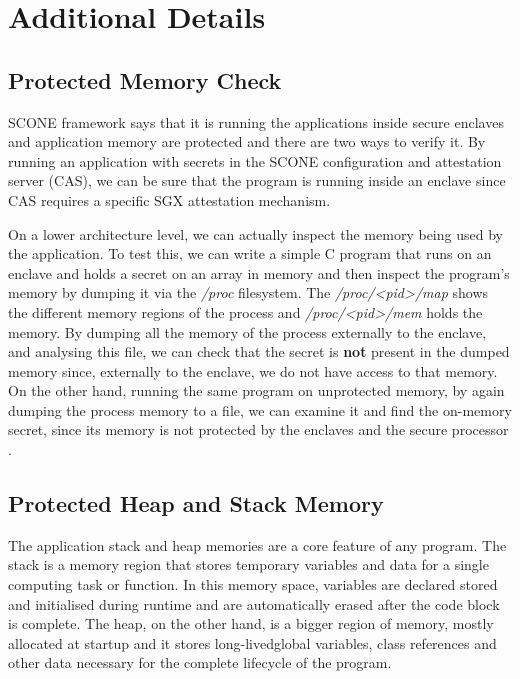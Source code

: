 \section{Additional Details}
\label{sec:additional_details}

\subsection{Protected Memory Check}
\label{ssec:protected_memory_check}

SCONE framework says that it is running the applications inside secure enclaves and application memory are protected and there are two ways to verify it. By running an application with secrets in the SCONE configuration and attestation server (\gls{CAS}), we can be sure that the program is running inside an enclave since CAS requires a specific \gls{SGX} attestation mechanism. 

On a lower architecture level, we can actually inspect the memory being used by the application. To test this, we can write a simple C program that runs on an enclave and holds a secret on an array in memory and then inspect the program's memory by dumping it via the \textit{/proc} filesystem. The \textit{/proc/<pid>/map} shows the different memory regions of the process and \textit{/proc/<pid>/mem} holds the memory. By dumping all the memory of the process externally to the enclave, and analysing this file, we can check that the secret is \textbf{not} present in the dumped memory since, externally to the enclave, we do not have access to that memory. On the other hand, running the same program on unprotected memory, by again dumping the process memory to a file, we can examine it and find the on-memory secret, since its memory is not protected by the enclaves and the secure processor \cite{scone:debug}.

\subsection{Protected Heap and Stack Memory}
\label{ssec:protected_heap_and_stack_memory}

The application stack and heap memories are a core feature of any program. The stack is a memory region that stores temporary variables and data for a single computing task or function. In this memory space, variables are declared stored and initialised during runtime and are automatically erased after the code block is complete. The heap, on the other hand, is a bigger region of memory, mostly allocated at startup and it stores long-livedglobal variables, class references and other data necessary for the complete lifecycle of the program.

